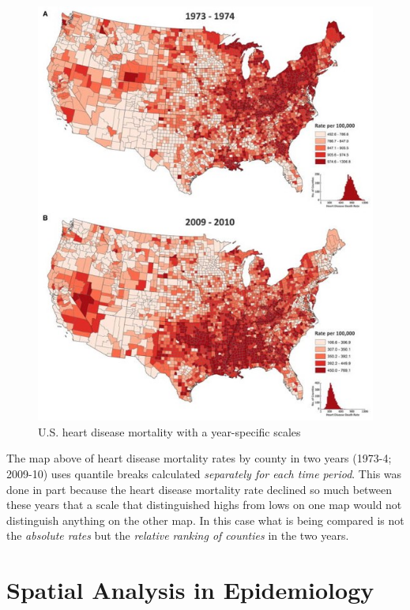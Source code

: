 \documentclass[
]{book}
\begin{document}
\begin{figure}
\centering
\includegraphics{images/time-series-us-quantiles.jpg}
\caption{\label{fig:unnamed-chunk-8}U.S. heart disease mortality with a year-specific scales}
\end{figure}

The map above of heart disease mortality rates by county in two years (1973-4; 2009-10) uses quantile breaks calculated \emph{separately for each time period}. This was done in part because the heart disease mortality rate declined so much between these years that a scale that distinguished highs from lows on one map would not distinguish anything on the other map. In this case what is being compared is not the \emph{absolute rates} but the \emph{relative ranking of counties} in the two years.

\hypertarget{spatial-analysis-in-epidemiology-1}{%
\section{Spatial Analysis in Epidemiology}\label{spatial-analysis-in-epidemiology-1}}
\end{document}
